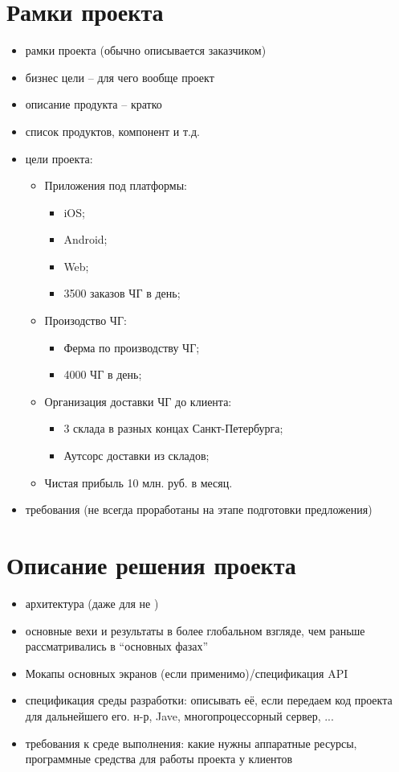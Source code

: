\documentclass[a4paper,8pt]{article}
\begin{document}
\section{Рамки проекта}
\begin{itemize}
  \item рамки проекта (обычно описывается заказчиком)
  \item бизнес цели -- для чего вообще проект
  \item описание продукта -- кратко
  \item список продуктов, компонент и т.д.
  \item цели проекта:
    \begin{itemize}
      \item Приложения под платформы:
          \begin{itemize}
              \item iOS;
              \item Android;
              \item Web;
              \item 3500 заказов ЧГ в день;
          \end{itemize}
      \item Произодство ЧГ:
          \begin{itemize}
              \item Ферма по производству ЧГ;
              \item 4000 ЧГ в день;
          \end{itemize}
      \item Организация доставки ЧГ до клиента:
          \begin{itemize}
              \item 3 склада в разных концах Санкт-Петербурга;
              \item Аутсорс доставки из складов;
          \end{itemize}
      \item Чистая прибыль 10 млн. руб. в месяц.
    \end{itemize}
  \item требования (не всегда проработаны на этапе подготовки предложения)
\end{itemize}

\section{Описание решения проекта}

\begin{itemize}
  \item архитектура (даже для не )
  \item основные вехи и результаты в более глобальном взгляде, чем раньше рассматривались в “основных фазах”
  \item Мокапы основных экранов (если применимо)/спецификация API
  \item спецификация среды разработки: описывать её, если передаем код проекта для дальнейшего его. н-р, Jave, многопроцессорный сервер, ...
  \item требования к среде выполнения: какие нужны аппаратные ресурсы, программные средства для работы проекта у клиентов
\end{itemize}
\end{document}
